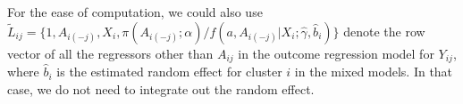 \documentclass[oupdraft]{biostatistics}
\begin{document}
{\color{red}For the ease of computation, we could also use $\tilde L_{ij}=\{1,A_{i(-j)},X_i,\pi(A_{i(-j)};\alpha)/f(a, A_{i(-j)}|X_i;\hat\gamma,\hat b_i)\}$ denote the row vector of all the regressors other than $A_{ij}$ in the outcome regression model for $Y_{ij}$, where $\hat b_i$ is the estimated random effect for cluster $i$ in the mixed models. In that case, we do not need to integrate out the random effect. }%

%
%
%
%
\end{document}
